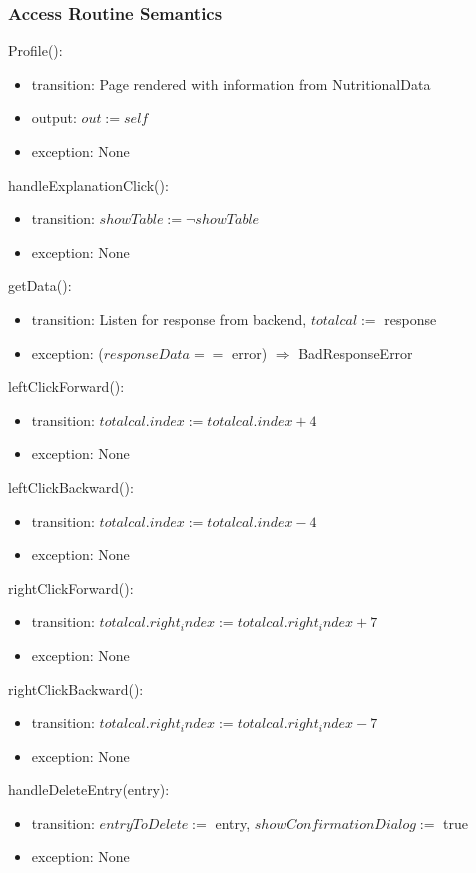 \documentclass[12pt, titlepage]{article}
\begin{document}
\subsubsection{Access Routine Semantics}
\noindent Profile():
\begin{itemize}
	\item transition: Page rendered with information from NutritionalData
	\item output: $out := self$
	\item exception: None
\end{itemize}
\noindent handleExplanationClick():
\begin{itemize}
	\item transition: $showTable := \lnot showTable$
	\item exception: None
\end{itemize}
\noindent getData():
\begin{itemize}
	\item transition: Listen for response from backend, $totalcal := $ response	
	\item exception: ($responseData ==$ error) $\Rightarrow$ BadResponseError
\end{itemize}
\noindent leftClickForward():
\begin{itemize}
	\item transition: $totalcal.index := totalcal.index + 4$
	\item exception: None
\end{itemize}
\noindent leftClickBackward():
\begin{itemize}
	\item transition: $totalcal.index := totalcal.index - 4$
	\item exception: None
\end{itemize}
\noindent rightClickForward():
\begin{itemize}
	\item transition: $totalcal.right_index := totalcal.right_index + 7$
	\item exception: None
\end{itemize}
\noindent rightClickBackward():
\begin{itemize}
	\item transition: $totalcal.right_index := totalcal.right_index - 7$
	\item exception: None
\end{itemize}
\noindent handleDeleteEntry(entry):
\begin{itemize}
	\item transition: $entryToDelete :=$ entry, $showConfirmationDialog :=$ true
	\item exception: None
\end{itemize}
\end{document}
